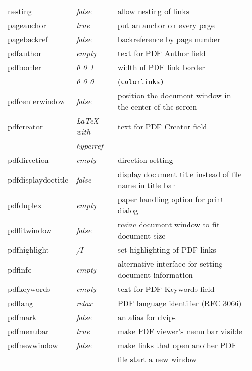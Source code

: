 \documentclass[pdftex]{article}
\begin{document}
\begin{longtable}{@{}>{\ttfamily}llp{7cm}@{}}
nesting            & \textit{false}         & allow nesting of links \\
pageanchor         & \textit{true}          & put an anchor on every page \\
pagebackref        & \textit{false}         & backreference by page number \\
pdfauthor          & \textit{empty}         & text for PDF Author field \\
pdfborder          & \textit{0 0 1}         & width of PDF link border \\
                   & \textit{0 0 0}         & (\texttt{colorlinks)} \\
pdfcenterwindow    & \textit{false}         & position the document window in the center of the screen \\
pdfcreator         & \textit{LaTeX with}    & text for PDF Creator field \\
                   & \textit{hyperref}      & \\
pdfdirection       & \textit{empty}         & direction setting \\
pdfdisplaydoctitle & \textit{false}         & display document title instead
                                              of file name in title bar\\
pdfduplex          & \textit{empty}         & paper handling option for
                                              print dialog\\
pdffitwindow       & \textit{false}         & resize document window to fit document size \\
pdfhighlight       & \textit{/I}            & set highlighting of PDF links \\
pdfinfo            & \textit{empty}         & alternative interface for setting document information\\
pdfkeywords        & \textit{empty}         & text for PDF Keywords field \\
pdflang            & \textit{relax}         & PDF language identifier (RFC 3066) \\
pdfmark            & \textit{false}         & an alias for \textsf{dvips} \\
pdfmenubar         & \textit{true}          & make PDF viewer's menu bar visible \\
pdfnewwindow       & \textit{false}         & make links that open another PDF \\
                   &                        & file start a new window \\

\end{longtable}
\end{document}
